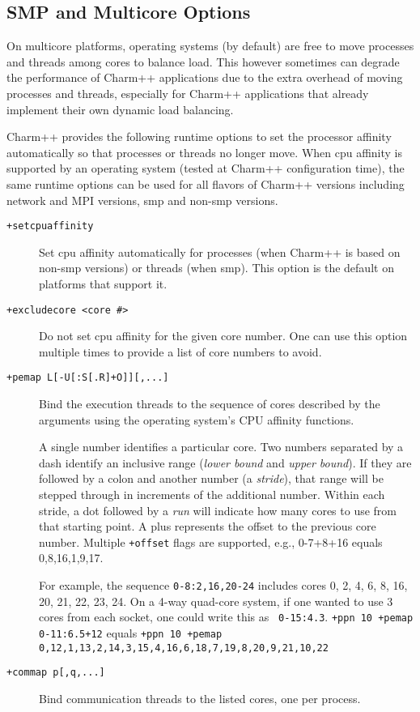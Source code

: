 \subsection{SMP and Multicore Options}

On multicore platforms, operating systems (by default) are free to move
processes and threads among cores to balance load. This however sometimes can
degrade the performance of Charm++ applications due to the extra overhead of
moving processes and threads, especially for Charm++ applications that already
implement their own dynamic load balancing.

Charm++ provides the following runtime options to set the processor affinity
automatically so that processes or threads no longer move. When cpu affinity
is supported by an operating system (tested at Charm++ configuration time),
the same runtime options can be used for all flavors of Charm++ versions
including network and MPI versions, smp and non-smp versions.

\begin{description}

\item[{\tt +setcpuaffinity}]             Set cpu affinity automatically for processes (when Charm++ is based on non-smp versions) or threads (when smp). This option is the default on platforms that support it.

\item[{\tt +excludecore <core \#>}]       Do not set cpu affinity for the given core number. One can use this option multiple times to provide a list of core numbers to avoid.

\item[{\tt +pemap L[-U[:S[.R]+O]][,...]}] Bind the execution threads to
  the sequence of cores described by the arguments using the operating
  system's CPU affinity functions.

A single number identifies a particular core. Two numbers separated by
a dash identify an inclusive range (\emph{lower bound} and \emph{upper
  bound}). If they are followed by a colon and another number (a
\emph{stride}), that range will be stepped through in increments of
the additional number. Within each stride, a dot followed by a
\emph{run} will indicate how many cores to use from that starting
point. A plus represents the offset to the previous core number. 
Multiple {\tt +offset} flags are supported, e.g., 0-7+8+16 equals 0,8,16,1,9,17.

For example, the sequence {\tt 0-8:2,16,20-24} includes cores 0, 2, 4,
6, 8, 16, 20, 21, 22, 23, 24. On a 4-way quad-core system, if one
wanted to use 3 cores from each socket, one could write this as {\tt
0-15:4.3}. {\tt +ppn 10 +pemap 0-11:6.5+12} equals {\tt +ppn 10 +pemap 
0,12,1,13,2,14,3,15,4,16,6,18,7,19,8,20,9,21,10,22}

\item[{\tt +commap p[,q,...]}] Bind communication threads to the
  listed cores, one per process.

\end{description}

